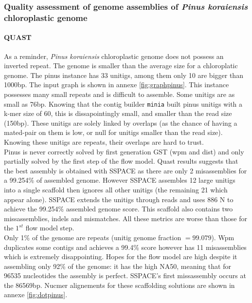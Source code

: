 \documentclass[12pt]{article}
\begin{document}
\clearpage
\subsubsection{Quality assessment of genome assemblies of \textit{Pinus koraiensis} chloroplastic genome}

\paragraph*{QUAST}
As a reminder, \textit{Pinus koraiensis} chloroplastic genome does not possess an inverted repeat. The genome is smaller than the average size for a chloroplatic genome. The pinus instance has 33 unitigs, among them only 10 are bigger than 1000bp. The input graph is shown in annexe \ref{fig:graphpinus}. This instance possesses many small repeats and is difficult to assemble. Some unitigs are as small as 76bp. Knowing that the contig builder \texttt{minia} built pinus unitigs with a k-mer size of 60, this is dissapointingly small, and smaller than the read size (150bp). These unitigs are solely linked by overlaps (as the chance of having a mated-pair on them is low, or null for unitigs smaller than the read size). Knowing these unitigs are repeats, their overlaps are hard to trust. \\
Pinus is never correctly solved by first generation GST (wpm and dist) and only partially solved by the first step of the flow model. Quast results suggests that the best assembly is obtained with SSPACE as there are only 2 misassemblies for a 99.254\% of assembled genome. However SSPACE assembles 12 large unitigs into a single scaffold then ignores all other unitigs (the remaining 21 which appear alone). SSPACE extends the unitigs through reads and uses 886 N to achieve the 99.254\% assembled genome score. This scaffold also contains two missassemblies, indels and mismatches. All these metrics are worse than those for the $1^{st}$ flow model step. \\ Only 1\% of the genome are repeats (unitig genome fraction $=99.079$). Wpm duplicates some contigs and achieves a 99.4\% score however has 11 misassemblies which is extremely disappointing. Hopes for the flow model are high despite it assembling only 92\% of the genome: it has the high NA50, meaning that for 96535 nucleotides the assembly is perfect. SSPACE's first missassembly occurs at the 86569bp. Nucmer alignements for these scaffolding solutions are shown in annexe \ref{fig:dotpinus}.
\end{document}
